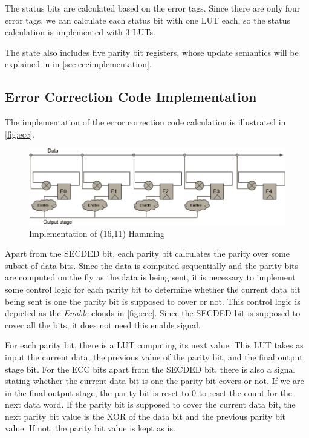 The status bits are calculated based on the error tags. Since there
are only four error tags, we can calculate each status bit with one
LUT each, so the status calculation is implemented with 3 LUTs. 

The state also includes five parity bit registers, whose update
semantics will be explained in in \autoref{sec:eccimplementation}.

\subsection{Error Correction Code Implementation}
\label{sec:eccimplementation}
The implementation of the error correction code calculation is
illustrated in \autoref{fig:ecc}. 

\begin{figure}
\includegraphics[width=15cm]{implementation/fig_ecc}
\caption{Implementation of (16,11) Hamming}
\label{fig:ecc}
\end{figure}

Apart from the SECDED bit, each parity bit calculates the parity over
some subset of data bits. Since the data is computed sequentially and
the parity bits are computed on the fly as the data is being sent, it
is necessary to implement some control logic for each parity bit to
determine whether the current data bit being sent is one the parity
bit is supposed to cover or not. This control logic is depicted as the
\textit{Enable} clouds in \autoref{fig:ecc}. Since the SECDED bit is
supposed to cover all the bits, it does not need this enable signal. 

For each parity bit, there is a LUT computing its next value. This LUT
takes as input the current data, the previous value of the parity bit,
and the final output stage bit. For the ECC bits apart from the SECDED
bit, there is also a signal stating whether the current data bit is
one the parity bit covers or not. If we are in the final output stage,
the parity bit is reset to 0 to reset the count for the next data
word. If the parity bit is supposed to cover the current data bit, the
next parity bit value is the XOR of the data bit and the previous
parity bit value. If not, the parity bit value is kept as is. 

